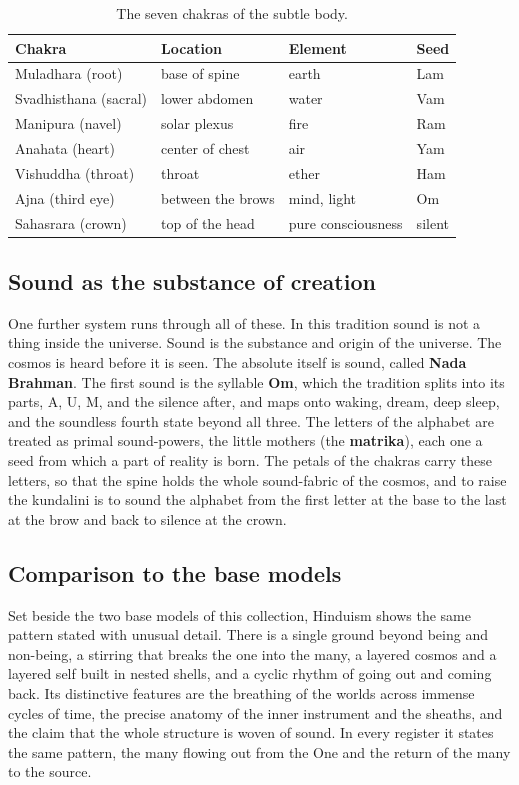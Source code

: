 \begin{longtable}{@{} L{0.26\textwidth}L{0.30\textwidth}L{0.18\textwidth}L{0.14\textwidth}@{}}
\caption{The seven chakras of the subtle body.}\\
\toprule
\textbf{Chakra} & \textbf{Location} & \textbf{Element} & \textbf{Seed} \\
\midrule
Muladhara (root) & base of spine & earth & Lam \\
Svadhisthana (sacral) & lower abdomen & water & Vam \\
Manipura (navel) & solar plexus & fire & Ram \\
Anahata (heart) & center of chest & air & Yam \\
Vishuddha (throat) & throat & ether & Ham \\
Ajna (third eye) & between the brows & mind, light & Om \\
Sahasrara (crown) & top of the head & pure consciousness & silent \\
\bottomrule
\end{longtable}

\subsection{Sound as the substance of creation}

One further system runs through all of these. In this tradition sound is not a thing inside the universe. Sound is the substance and origin of the universe. The cosmos is heard before it is seen. The absolute itself is sound, called \textbf{Nada Brahman}. The first sound is the syllable \textbf{Om}, which the tradition splits into its parts, A, U, M, and the silence after, and maps onto waking, dream, deep sleep, and the soundless fourth state beyond all three. The letters of the alphabet are treated as primal sound-powers, the little mothers (the \textbf{matrika}), each one a seed from which a part of reality is born. The petals of the chakras carry these letters, so that the spine holds the whole sound-fabric of the cosmos, and to raise the kundalini is to sound the alphabet from the first letter at the base to the last at the brow and back to silence at the crown.

\subsection{Comparison to the base models}

Set beside the two base models of this collection, Hinduism shows the same pattern stated with unusual detail. There is a single ground beyond being and non-being, a stirring that breaks the one into the many, a layered cosmos and a layered self built in nested shells, and a cyclic rhythm of going out and coming back. Its distinctive features are the breathing of the worlds across immense cycles of time, the precise anatomy of the inner instrument and the sheaths, and the claim that the whole structure is woven of sound. In every register it states the same pattern, the many flowing out from the One and the return of the many to the source.
